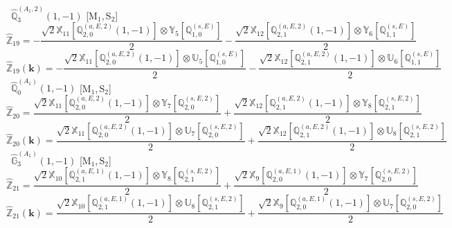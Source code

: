 \documentclass[fleqn,10pt,landscape]{article}
\begin{document}
\begin{itemize}
\begin{dmath*}
\end{dmath*}
\vspace{4mm}
\noindent {} $\,\,\,\hat{\mathbb{Q}}_{3}^{(A_{1},2)}(1,-1)$ [M$_{1}$,\,S$_{2}$]
\begin{dmath*}
\hat{\mathbb{Z}}_{19}=- \frac{\sqrt{2} \mathbb{X}_{11}[\mathbb{Q}_{2,0}^{(a,E,2)}(1,-1)] \otimes\mathbb{Y}_{5}[\mathbb{Q}_{1,0}^{(s,E)}]}{2} - \frac{\sqrt{2} \mathbb{X}_{12}[\mathbb{Q}_{2,1}^{(a,E,2)}(1,-1)] \otimes\mathbb{Y}_{6}[\mathbb{Q}_{1,1}^{(s,E)}]}{2}
\end{dmath*}
\begin{dmath*}
\hat{\mathbb{Z}}_{19}(\bm{k})=- \frac{\sqrt{2} \mathbb{X}_{11}[\mathbb{Q}_{2,0}^{(a,E,2)}(1,-1)] \otimes\mathbb{U}_{5}[\mathbb{Q}_{1,0}^{(s,E)}]}{2} - \frac{\sqrt{2} \mathbb{X}_{12}[\mathbb{Q}_{2,1}^{(a,E,2)}(1,-1)] \otimes\mathbb{U}_{6}[\mathbb{Q}_{1,1}^{(s,E)}]}{2}
\end{dmath*}
\vspace{4mm}
\noindent {} $\,\,\,\hat{\mathbb{Q}}_{0}^{(A_{1})}(1,-1)$ [M$_{1}$,\,S$_{2}$]
\begin{dmath*}
\hat{\mathbb{Z}}_{20}=\frac{\sqrt{2} \mathbb{X}_{11}[\mathbb{Q}_{2,0}^{(a,E,2)}(1,-1)] \otimes\mathbb{Y}_{7}[\mathbb{Q}_{2,0}^{(s,E,2)}]}{2} + \frac{\sqrt{2} \mathbb{X}_{12}[\mathbb{Q}_{2,1}^{(a,E,2)}(1,-1)] \otimes\mathbb{Y}_{8}[\mathbb{Q}_{2,1}^{(s,E,2)}]}{2}
\end{dmath*}
\begin{dmath*}
\hat{\mathbb{Z}}_{20}(\bm{k})=\frac{\sqrt{2} \mathbb{X}_{11}[\mathbb{Q}_{2,0}^{(a,E,2)}(1,-1)] \otimes\mathbb{U}_{7}[\mathbb{Q}_{2,0}^{(s,E,2)}]}{2} + \frac{\sqrt{2} \mathbb{X}_{12}[\mathbb{Q}_{2,1}^{(a,E,2)}(1,-1)] \otimes\mathbb{U}_{8}[\mathbb{Q}_{2,1}^{(s,E,2)}]}{2}
\end{dmath*}
\vspace{4mm}
\noindent {} $\,\,\,\hat{\mathbb{G}}_{3}^{(A_{1})}(1,-1)$ [M$_{1}$,\,S$_{2}$]
\begin{dmath*}
\hat{\mathbb{Z}}_{21}=\frac{\sqrt{2} \mathbb{X}_{10}[\mathbb{Q}_{2,1}^{(a,E,1)}(1,-1)] \otimes\mathbb{Y}_{8}[\mathbb{Q}_{2,1}^{(s,E,2)}]}{2} + \frac{\sqrt{2} \mathbb{X}_{9}[\mathbb{Q}_{2,0}^{(a,E,1)}(1,-1)] \otimes\mathbb{Y}_{7}[\mathbb{Q}_{2,0}^{(s,E,2)}]}{2}
\end{dmath*}
\begin{dmath*}
\hat{\mathbb{Z}}_{21}(\bm{k})=\frac{\sqrt{2} \mathbb{X}_{10}[\mathbb{Q}_{2,1}^{(a,E,1)}(1,-1)] \otimes\mathbb{U}_{8}[\mathbb{Q}_{2,1}^{(s,E,2)}]}{2} + \frac{\sqrt{2} \mathbb{X}_{9}[\mathbb{Q}_{2,0}^{(a,E,1)}(1,-1)] \otimes\mathbb{U}_{7}[\mathbb{Q}_{2,0}^{(s,E,2)}]}{2}

\end{dmath*}
\end{itemize}
\end{document}
